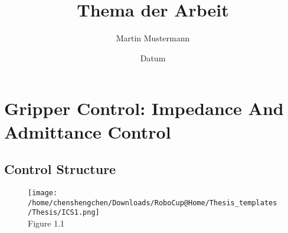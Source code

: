 %
% 
% 
%


\renewcommand{\Thema}{%
    Thema der Arbeit (optional)}




\title{Thema der Arbeit}
\author{Martin Mustermann}
\date{Datum}


\tableofcontents %

\chapter{Gripper Control: Impedance And Admittance Control}

\section{Control Structure}




\begin{figure}[!ht]
\centering
\noindent\hspace{0.5mm}\texttt{[image: /home/chenshengchen/Downloads/RoboCup@Home/Thesis\_templates/Thesis/ICS1.png]}\\
\centering
Figure 1.1\\
\end{figure}

